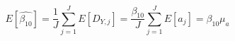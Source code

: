 \begin{equation}
\label{avgest}
E[\hat{\beta_{10}}] = \frac{1}{J}\sum\limits_{j=1}^J{E[D_{Y,j}]} = \frac{\beta_{10}}{J}\sum\limits_{j=1}^J{E[a_j]} = \beta_{10}\mu_{a}
\end{equation}